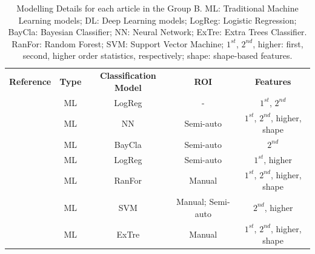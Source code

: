 \documentclass{article}
\begin{document}
\begin{table}[]
    \centering
    \begin{tabular}{ccccc}\toprule
        \multirow{2}{*}{\textbf{Reference}} & \multirow{2}{*}{\textbf{Type}} & \multirow{2}{*}{\textbf{Classification Model}} & \multirow{2}{*}{\textbf{ROI}} & \multirow{2}{*}{\textbf{Features}} \\
        \\ \midrule
        \cite{Shoemaker2018}                & ML                             & LogReg                                         & -                             & $1^{st}$, $2^{nd}$                 \\
        \cite{Koyuncu2019}                  & ML                             & NN                                             & Semi-auto                     & $1^{st}$, $2^{nd}$, higher, shape  \\
        \cite{Li2019}                       & ML                             & BayCla                                         & Semi-auto                     & $2^{nd}$                           \\
        \cite{Andersen2021}                 & ML                             & LogReg                                         & Semi-auto                     & $1^{st}$, higher                   \\
        \cite{Moawad2021}                   & ML                             & RanFor                                         & Manual                        & $1^{st}$, $2^{nd}$, higher, shape  \\
        \cite{Barstugan2020}                & ML                             &
        SVM                                 & Manual; Semi-auto
                                            & $2^{nd}$, higher                                                                                                                                     \\
        \cite{Stanzione2021}                & ML                             & ExTre                                          & Manual                        & $1^{st}$, $2^{nd}$, higher, shape  \\
        \bottomrule
    \end{tabular}
    \caption{Modelling Details for each article in the Group B. ML: Traditional Machine Learning models; DL: Deep Learning models; LogReg: Logistic Regression; BayCla: Bayesian Classifier; NN: Neural Network; ExTre: Extra Trees Classifier.
        RanFor: Random Forest; SVM: Support Vector Machine; $1^{st}$, $2^{nd}$, higher: first, second, higher order statistics, respectively; shape: shape-based features.}
    \label{tab:model_B}
\end{table}
\end{document}
